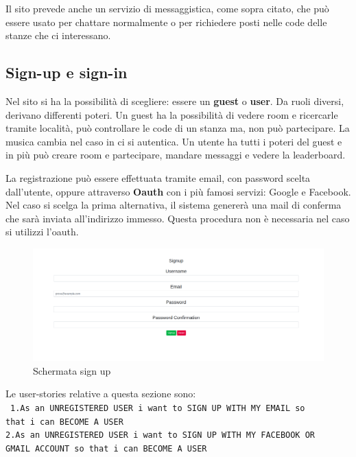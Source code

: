	Il sito prevede anche un servizio di messaggistica, come sopra citato, che può essere usato per chattare normalmente o per richiedere posti nelle code delle stanze che ci interessano.
	
	\subsection{Sign-up e sign-in}
	\label{sec:signup}
	Nel sito si ha la possibilità di scegliere: essere un \textbf{guest} o \textbf{user}. Da ruoli diversi, derivano differenti poteri. Un guest ha la possibilità di vedere room e ricercarle tramite località, può controllare le code di un stanza ma, non può partecipare. La musica cambia nel caso in ci si autentica. Un utente ha tutti i poteri del guest e in più può creare room e partecipare, mandare messaggi e vedere la leaderboard.
	
	La registrazione può essere effettuata tramite email, con password scelta dall'utente, oppure attraverso \textbf{Oauth} con i più famosi servizi: Google e Facebook. Nel caso si scelga la prima alternativa, il sistema genererà una mail di conferma che sarà inviata all'indirizzo immesso. Questa procedura non è necessaria nel caso si utilizzi l'oauth.
	
	\begin{figure}[H]
		\includegraphics[width=\columnwidth]{./media/image11.png}
		\caption{Schermata sign up}
	\end{figure}	
	Le user-stories relative a questa sezione sono:\\\
	\texttt{1.As an UNREGISTERED USER i want to SIGN UP WITH MY EMAIL so \\ that i can BECOME A USER}\\
	\texttt{2.As an UNREGISTERED USER i want to SIGN UP WITH MY FACEBOOK OR \\ GMAIL ACCOUNT so that i can BECOME A USER}\\\
	

